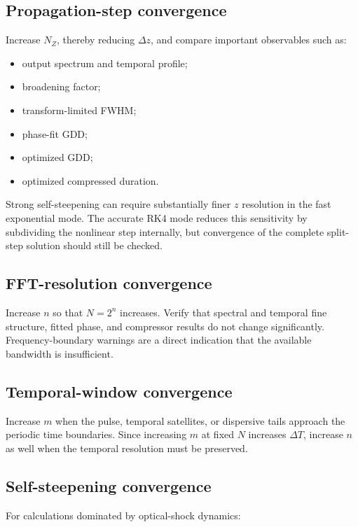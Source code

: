 \documentclass[11pt,a4paper]{article}
\begin{document}
\subsection{Propagation-step convergence}

Increase $N_Z$, thereby reducing $\Delta z$, and compare important observables
such as:

\begin{itemize}
    \item output spectrum and temporal profile;
    \item broadening factor;
    \item transform-limited FWHM;
    \item phase-fit GDD;
    \item optimized GDD;
    \item optimized compressed duration.
\end{itemize}

Strong self-steepening can require substantially finer $z$ resolution in the
fast exponential mode. The accurate RK4 mode reduces this sensitivity by
subdividing the nonlinear step internally, but convergence of the complete
split-step solution should still be checked.

\subsection{FFT-resolution convergence}

Increase $n$ so that $N=2^n$ increases. Verify that spectral and temporal fine
structure, fitted phase, and compressor results do not change significantly.
Frequency-boundary warnings are a direct indication that the available
bandwidth is insufficient.

\subsection{Temporal-window convergence}

Increase $m$ when the pulse, temporal satellites, or dispersive tails approach
the periodic time boundaries. Since increasing $m$ at fixed $N$ increases
$\Delta T$, increase $n$ as well when the temporal resolution must be preserved.

\subsection{Self-steepening convergence}

For calculations dominated by optical-shock dynamics:
\end{document}
